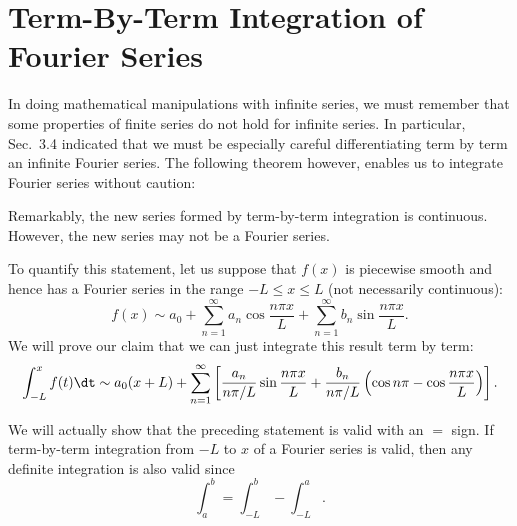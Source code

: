 \section{Term-By-Term Integration of Fourier Series}
\label{sec:term-integration}

In doing mathematical manipulations with infinite series, we must remember that some properties of finite series do not hold for infinite series.  In particular, Sec.~3.4 indicated that we must be especially careful differentiating term by term an infinite Fourier series.  The following theorem however, enables us to integrate Fourier series without caution:

\begin{center}
\end{center}

Remarkably, the new series formed by term-by-term integration is continuous.  However, the new series may not be a Fourier series.

To quantify this statement, let us suppose that $f(x)$ is piecewise smooth and hence has a Fourier series in the range $-L \le x \le L$ (not necessarily continuous):
\begin{equation}
\label{eq:f-fourier}
f(x) \sim a_0 + \sum_{n=1}^{\infty} a_n \cos \frac{n\pi x}{L} + \sum_{n=1}^{\infty} b_n \sin \frac{n\pi x}{L}.
\end{equation}
We will prove our claim that we can just integrate this result term by term:
\begin{equation}
\label{eq:f-integrated}
\int_{-L}^{x} f(t) \dt \sim a_0(x + L) + \sum_{n=1}^{\infty}\left[\frac{a_n}{n\pi/L}\sin\frac{n\pi x}{L} + \frac{b_n}{n\pi/L}\left(\cos n\pi - \cos\frac{n\pi x}{L}\right)\right].
\end{equation}

We will actually show that the preceding statement is valid with an $=$ sign.  If term-by-term integration from $-L$ to $x$ of a Fourier series is valid, then any definite integration is also valid since
\[
\int_a^b = \int_{-L}^{b} - \int_{-L}^{a}.
\]

